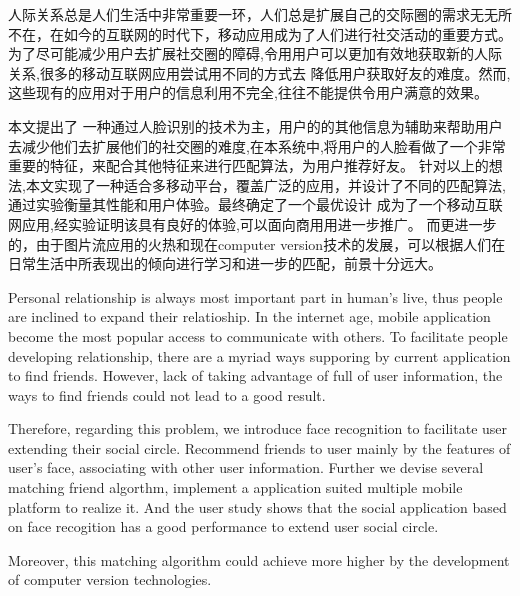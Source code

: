 
\begin{cabstract}
	人际关系总是人们生活中非常重要一环，⼈们总是扩展自己的交际圈的需求⽆无所不在，在如今的互联网的时代下，移动应用成为了人们进行社交活动的重要方式。为了尽可能减少用户去扩展社交圈的障碍,令⽤用户可以更加有效地获取新的人际关系,很多的移动互联⽹应用尝试用不同的方式去 降低用户获取好友的难度。然⽽,这些现有的应用对于用户的信息利用不完全,往往不能提供令用户满意的效果。

	本⽂提出了 ⼀种通过人脸识别的技术为主，用户的的其他信息为辅助来帮助用户去减少他们去扩展他们的社交圈的难度,在本系统中,将用户的人脸看做了一个非常重要的特征，来配合其他特征来进行匹配算法，为用户推荐好友。 
针对以上的想法,本⽂实现了一种适合多移动平台，覆盖广泛的应用，并设计了不同的匹配算法,通过实验衡量其性能和用户体验。最终确定了一个最优设计 成为了一个移动互联⽹应⽤,经实验证明该具有良好的体验,可以面向商⽤用进⼀步推⼴。
而更进一步的，由于图片流应用的火热和现在computer version技术的发展，可以根据人们在日常生活中所表现出的倾向进行学习和进一步的匹配，前景十分远大。


\end{cabstract}

\begin{eabstract}
	Personal relationship is always most important part in human's live, thus people are inclined to expand their relatioship. In the internet age, mobile application become the most popular access to communicate with others. To facilitate people developing relationship, there are a myriad ways supporing by current application to find friends. 
	However, lack of taking advantage of full of user information, the ways to find friends could not lead to a good result.

	Therefore, regarding this problem, we introduce face recognition to facilitate user extending their social circle. Recommend friends to user mainly by the features of user's face, associating with other user information. Further we devise several matching friend algorthm, implement a application suited multiple mobile platform to realize it. And the user study shows that the social application based on face recogition has a good performance to extend user social circle. 

	Moreover, this matching algorithm could achieve more higher by the development of computer version technologies.   
\end{eabstract}

